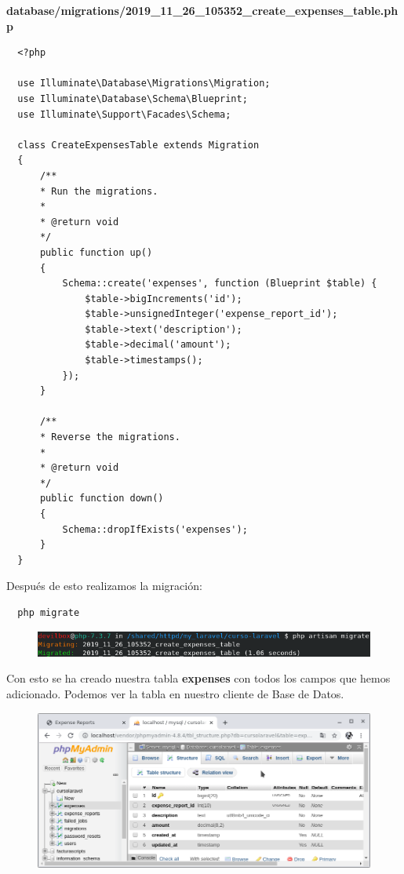 \documentclass{article}
\begin{document}
\textbf{database/migrations/2019\_11\_26\_105352\_create\_expenses\_table.php}
\begin{verbatim}
  <?php

  use Illuminate\Database\Migrations\Migration;
  use Illuminate\Database\Schema\Blueprint;
  use Illuminate\Support\Facades\Schema;

  class CreateExpensesTable extends Migration
  {
      /**
      * Run the migrations.
      *
      * @return void
      */
      public function up()
      {
          Schema::create('expenses', function (Blueprint $table) {
              $table->bigIncrements('id');
              $table->unsignedInteger('expense_report_id');
              $table->text('description');
              $table->decimal('amount');
              $table->timestamps();
          });
      }

      /**
      * Reverse the migrations.
      *
      * @return void
      */
      public function down()
      {
          Schema::dropIfExists('expenses');
      }
  }
\end{verbatim}

Después de esto realizamos la migración:\\

\begin{verbatim}
  php migrate
\end{verbatim}

\begin{figure}[h!]
  \centering
  \includegraphics[scale=0.75]{./Pictures/104_artisan_migrate.png}
\end{figure}

Con esto se ha creado nuestra tabla \textbf{expenses} con todos los campos que
hemos adicionado. Podemos ver la tabla en nuestro cliente de Base de Datos.

\begin{figure}[h!]
  \centering
  \includegraphics[scale=0.5]{./Pictures/105_tabla_creada.png}
\end{figure}
\end{document}
